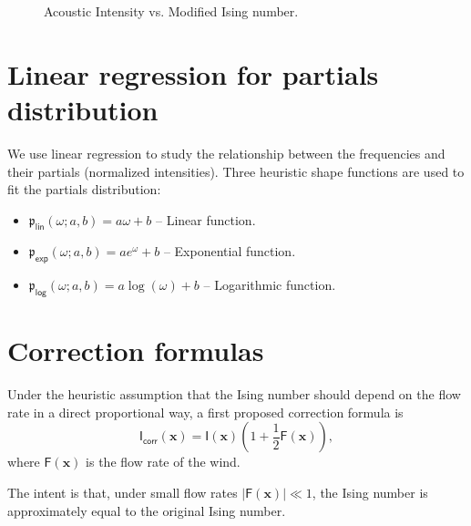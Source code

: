 \documentclass{psu-report}
\begin{document}
\begin{figure}[htbp]
    \centering
    \caption{Acoustic Intensity vs. Modified Ising number.}
\end{figure}



\section{Linear regression for partials distribution}

We use linear regression to study the relationship between the frequencies and
their partials (normalized intensities).
Three heuristic shape functions are used to fit the partials distribution:
\begin{itemize}
    \item \(\mathfrak{p}_\mathsf{lin}(\omega; a, b) = a \omega + b\) -- Linear function.
    \item \(\mathfrak{p}_\mathsf{exp}(\omega; a, b) = a e^{\omega} + b\) -- Exponential function.
    \item \(\mathfrak{p}_\mathsf{log}(\omega; a, b) = a \log(\omega) + b\) -- Logarithmic function.
\end{itemize}

\section{Correction formulas}

Under the heuristic assumption that the Ising number should depend on the flow
rate in a direct proportional way, a first proposed correction formula is
\begin{equation}
    \label{eq:ising_correction}
    \mathsf{I}_\mathsf{corr}(\mathbf{x}) = \mathsf{I}(\mathbf{x})
    (1 + \frac{1}{2} \mathsf{F}(\mathbf{x})),
\end{equation}
where \(\mathsf{F}(\mathbf{x})\) is the flow rate of the wind.

The intent is that, under small flow rates \(|\mathsf{F}(\mathbf{x})| \ll 1\),
the Ising number is approximately equal to the original Ising number.
\end{document}
